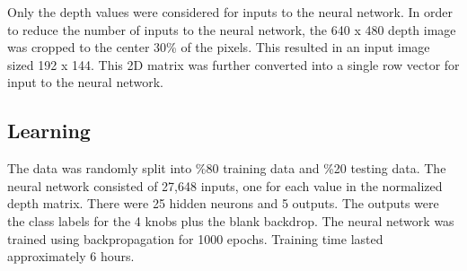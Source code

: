 \documentclass{article}
\begin{document}
Only the depth values were considered for inputs to the neural network. In order to reduce the number of inputs to the neural network, the 640 x 480 depth image was cropped to the center 30\% of the pixels. This resulted in an input image sized 192 x 144. This 2D matrix was further converted into a single row vector for input to the neural network.



\subsection{Learning}
The data was randomly split into \%80 training data and \%20 testing data. The neural network consisted of 27,648 inputs, one for each value in the normalized depth matrix.  There were 25 hidden neurons and 5 outputs. The outputs were the class labels for the 4 knobs plus the blank backdrop.  The neural network was trained using backpropagation for 1000 epochs. Training time lasted approximately 6 hours.
\end{document}

